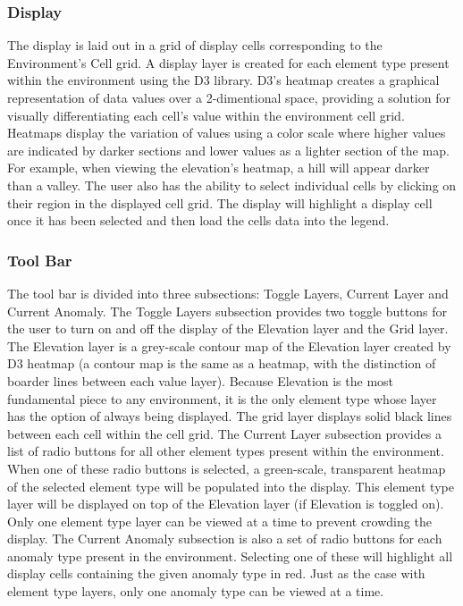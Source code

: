 \subsubsection{Display}
The display is laid out in a grid of display cells corresponding to the Environment's Cell grid.
A display layer is created for each element type present within the environment using the D3 library.
D3's heatmap creates a graphical representation of data values over a 2-dimentional space, providing a solution for visually differentiating each cell's value within the environment cell grid.
Heatmaps display the variation of values using a color scale where higher values are indicated by darker sections and lower values as a lighter section of the map.
For example, when viewing the elevation's heatmap, a hill will appear darker than a valley.
The user also has the ability to select individual cells by clicking on their region in the displayed cell grid.
The display will highlight a display cell once it has been selected and then load the cells data into the legend.


\subsubsection{Tool Bar}
The tool bar is divided into three subsections: Toggle Layers, Current Layer and Current Anomaly.
The Toggle Layers subsection provides two toggle buttons for the user to turn on and off the display of the Elevation layer and the Grid layer.
The Elevation layer is a grey-scale contour map of the Elevation layer created by D3 heatmap (a contour map is the same as a heatmap, with the distinction of boarder lines between each value layer).
Because Elevation is the most fundamental piece to any environment, it is the only element type whose layer has the option of always being displayed.
The grid layer displays solid black lines between each cell within the cell grid.
The Current Layer subsection provides a list of radio buttons for all other element types present within the environment.
When one of these radio buttons is selected, a green-scale, transparent heatmap of the selected element type will be populated into the display.
This element type layer will be displayed on top of the Elevation layer (if Elevation is toggled on).
Only one element type layer can be viewed at a time to prevent crowding the display.
The Current Anomaly subsection is also a set of radio buttons for each anomaly type present in the environment.
Selecting one of these will highlight all display cells containing the given anomaly type in red.
Just as the case with element type layers, only one anomaly type can be viewed at a time.


